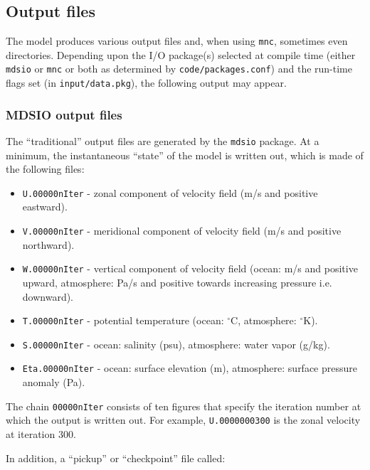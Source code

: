 \subsection{Output files}

The model produces various output files and, when using \texttt{mnc},
sometimes even directories.  Depending upon the I/O package(s)
selected at compile time (either \texttt{mdsio} or \texttt{mnc} or
both as determined by \texttt{code/packages.conf}) and the run-time
flags set (in \texttt{input/data.pkg}), the following output may
appear.


\subsubsection{MDSIO output files}

The ``traditional'' output files are generated by the \texttt{mdsio}
package.  At a minimum, the instantaneous ``state'' of the model is
written out, which is made of the following files:

\begin{itemize}
\item \texttt{U.00000nIter} - zonal component of velocity field (m/s
  and positive eastward).

\item \texttt{V.00000nIter} - meridional component of velocity field
  (m/s and positive northward).

\item \texttt{W.00000nIter} - vertical component of velocity field
  (ocean: m/s and positive upward, atmosphere: Pa/s and positive
  towards increasing pressure i.e. downward).

\item \texttt{T.00000nIter} - potential temperature (ocean:
  $^{\circ}\mathrm{C}$, atmosphere: $^{\circ}\mathrm{K}$).

\item \texttt{S.00000nIter} - ocean: salinity (psu), atmosphere: water
  vapor (g/kg).

\item \texttt{Eta.00000nIter} - ocean: surface elevation (m),
  atmosphere: surface pressure anomaly (Pa).
\end{itemize}

The chain \texttt{00000nIter} consists of ten figures that specify the
iteration number at which the output is written out. For example,
\texttt{U.0000000300} is the zonal velocity at iteration 300.

In addition, a ``pickup'' or ``checkpoint'' file called:

